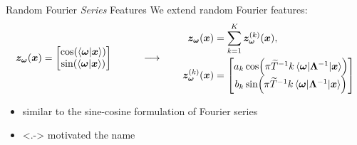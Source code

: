 \documentclass[
	USenglish,
	aspectratio=43,
	color={accentcolor=1c},
	logo=true,
	colorframetitle=true,
	hyperref={pdfpagelabels=true},
]{tudabeamer}
\begin{document}
		\begin{frame}{Random Fourier \emph{Series} Features}
			We extend random Fourier features:
			\begin{equation}
				\begin{aligned}
					\vec{z}_{\vec{\omega}}(\vec{x}) &=
						\begin{bmatrix}
							\cos(\ip{\vec{\omega}}{\vec{x}}) \\
							\sin(\ip{\vec{\omega}}{\vec{x}})
						\end{bmatrix}
				\end{aligned}
				\qquad\longrightarrow\qquad
				\begin{aligned}
					\vec{z}_{\vec{\omega}}(\vec{x}) &= \sum_{k = 1}^{K} \vec{z}_{\vec{\omega}}^{(k)}(\vec{x}), \\
					\vec{z}_{\vec{\omega}}^{(k)}(\vec{x}) &=
						\begin{bmatrix}
							a_k \cos(\pi \tilde{T}^{-1} k \mel{\vec{\omega}}{\bm{\Lambda}^{-1}}{\vec{x}}) \\
							b_k \sin(\pi \tilde{T}^{-1} k \mel{\vec{\omega}}{\bm{\Lambda}^{-1}}{\vec{x}})
						\end{bmatrix}
				\end{aligned}
			\end{equation}
			\begin{itemize}
				\item<+-> similar to the sine-cosine formulation of Fourier series
				\item<.-> motivated the name
			\end{itemize}
		\end{frame}
\end{document}
